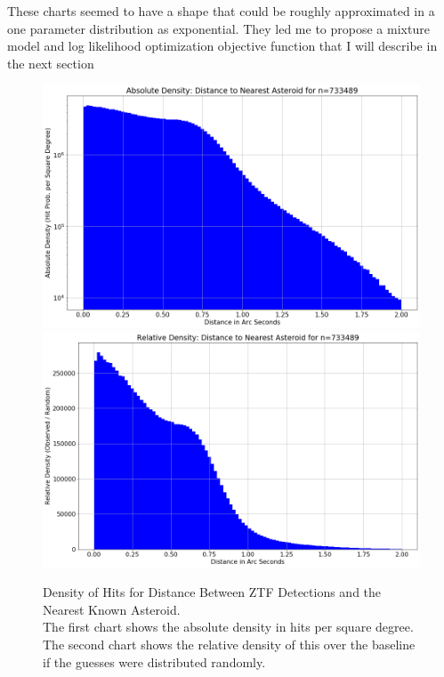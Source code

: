 These charts seemed to have a shape that could be roughly approximated in a one parameter distribution as exponential.
They led me to propose a mixture model and log likelihood optimization objective function that I will describe in the next section
\begin{figure}[hbt!]
\begin{center}
\includegraphics[width=1.0\textwidth]{../figs/ztf/nearest_ast_hist_dens_abs.png}
\includegraphics[width=1.0\textwidth]{../figs/ztf/nearest_ast_hist_dens_rel.png}
\end{center}
\caption[Density of Hits for Distance Between ZTF Detections and the Nearest Known Asteroid]
{Density of Hits for Distance Between ZTF Detections and the Nearest Known Asteroid. \\
The first chart shows the absolute density in hits per square degree.\\
The second chart shows the relative density of this over the baseline if the guesses were distributed randomly.}
\label{fig:ztf_hit_density}
\end{figure}

